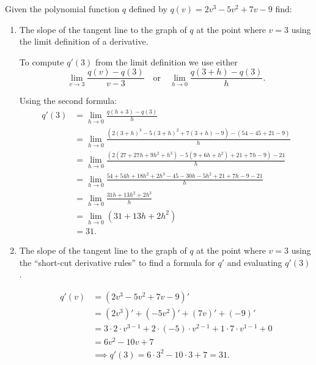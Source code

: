 \documentclass[nooutcomes]{ximera}
\begin{document}
\begin{problem}
  Given the polynomial function $q$ defined by $q(v) = 2v^3 - 5v^2 + 7v - 9$ find:
  \begin{enumerate}

    \item
      The slope of the tangent line to the graph of $q$ at the point where $v = 3$ using the limit definition of a derivative.
      \begin{freeResponse}
        To compute $q'(3)$ from the limit definition we use either 
        \[
          \lim_{v \to 3} \frac{q(v)-q(3)}{v-3} \quad \text{or} \quad \lim_{h \to 0} \frac{q(3+h)-q(3)}{h}.
        \]

        
        Using the second formula:
        \begin{align*}
          q'(3) &= \lim_{h \to 0} \frac{q(h+3)-q(3)}{h} \\
          &= \lim_{h \to 0} \frac{(2(3+h)^3 - 5(3+h)^2 + 7(3+h) - 9) - (54 - 45 + 21 - 9)}{h}\\
          &= \lim_{h \to 0} \frac{(2(27+27h+9h^2+h^3) - 5(9+6h+h^2) + 21+7h - 9) - 21}{h} \\
          &= \lim_{h \to 0} \frac{54+54h+18h^2+2h^3-45-30h-5h^2+21+7h-9-21}{h} \\
          &= \lim_{h \to 0} \frac{31h+13h^2+2h^3}{h} \\
          &= \lim_{h \to 0} (31+13h+2h^2)\\
          &= 31.
        \end{align*}
      \end{freeResponse}


    \item

      The slope of the tangent line to the graph of $q$ at the point where $v = 3$ using the ``short-cut derivative rules'' to find a formula for $q'$ and evaluating $q'(3)$.
      \begin{freeResponse} \hfil

        \begin{align*}
          q'(v) &= (2v^3 - 5v^2 + 7v - 9)'\\
          &= (2v^3)' + (-5v^2)' + (7v)' + (-9)' \\
          &= 3\cdot 2 \cdot v^{3-1} + 2\cdot (-5)\cdot v^{2-1} + 1\cdot 7\cdot v^{1-1} + 0 \\
          &= 6v^2 - 10v + 7\\
          &\implies q'(3) = 6\cdot3^2 - 10\cdot3 + 7 = 31.
        \end{align*}
      \end{freeResponse}



\end{enumerate}
\end{problem}
\end{document}
